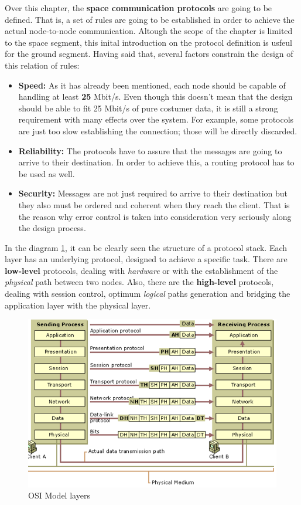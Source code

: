 Over this chapter, the \textbf{space communication protocols} are going to be defined. That is, a set of rules are going to be established in order to achieve the actual node-to-node communication. Altough the scope of the chapter is limited to the space segment, this inital introduction on the protocol definition is usfeul for the ground segment.
Having said that, several factors constrain the design of this relation of rules:

\begin{itemize}
\renewcommand{\labelitemi}{\scriptsize$\blacksquare$} 
\item \textbf{Speed:} As it has already been mentioned, each node should be capable of handling at least \textbf{25} Mbit/s. Even though this doesn't mean that the design should be able to fit 25 Mbit/s of pure costumer data, it is still a strong requirement with many effects over the system. For example, some protocols are just too slow establishing the connection; those will be directly discarded.

\item \textbf{Reliability:} The protocols have to assure that the messages are going to arrive to their destination. In order to achieve this, a routing protocol has to be used as well.


\item \textbf{Security:} Messages are not just required to arrive to their destination but they also must be ordered and coherent when they reach the client. That is the reason why error control is taken into consideration very seriously along the design process.
\end{itemize}
In the diagram \ref{fig:OsiModelLayers}, it can be clearly seen the structure of a protocol stack. Each layer has an underlying protocol, designed to achieve a specific task. There are \textbf{low-level} protocols, dealing with \textit{hardware} or with the establishment of the \textit{physical} path between two nodes. Also, there are the \textbf{high-level} protocols, dealing with session control, optimum \textit{logical} paths generation and bridging the application layer with the physical layer.
\begin{figure}[H]
\centering
\includegraphics[scale=0.8]{./sections/CommunicationsDept/OSI}
\caption{OSI Model layers}
\label{fig:OsiModelLayers}
\end{figure}

